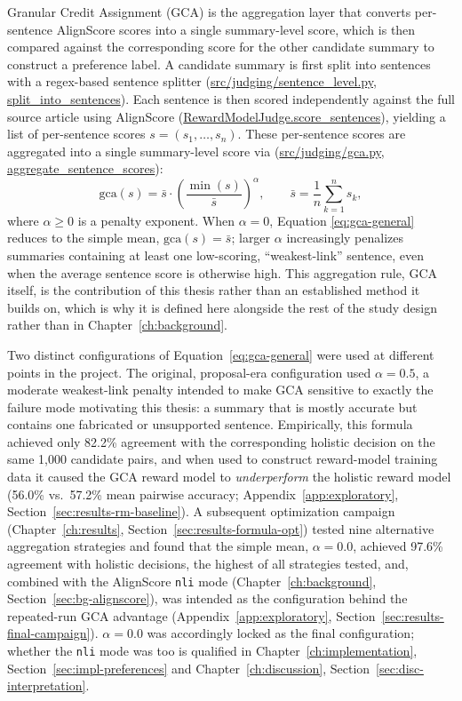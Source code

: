 Granular Credit Assignment (GCA) is the aggregation layer that converts
per-sentence AlignScore scores into a single summary-level score, which is then
compared against the corresponding score for the other candidate summary to
construct a preference label. A candidate summary is first split into sentences
with a regex-based sentence splitter (\url{src/judging/sentence_level.py},
\url{split_into_sentences}). Each sentence is then scored independently
against the full source article using AlignScore
(\url{RewardModelJudge.score_sentences}), yielding a list of per-sentence
scores $s = (s_1, \ldots, s_n)$. These per-sentence scores are aggregated into a
single summary-level score via (\url{src/judging/gca.py},
\url{aggregate_sentence_scores}):
\begin{equation}
  \mathrm{gca}(s) = \bar{s} \cdot \left( \frac{\min(s)}{\bar{s}} \right)^{\alpha},
  \qquad \bar{s} = \frac{1}{n}\sum_{k=1}^{n} s_k,
  \label{eq:gca-general}
\end{equation}
where $\alpha \geq 0$ is a penalty exponent. When $\alpha = 0$, Equation
\ref{eq:gca-general} reduces to the simple mean, $\mathrm{gca}(s) = \bar{s}$;
larger $\alpha$ increasingly penalizes summaries containing at least one
low-scoring, ``weakest-link'' sentence, even when the average sentence score is
otherwise high. This aggregation rule, GCA itself, is the contribution of this
thesis rather than an established method it builds on, which is why it is
defined here alongside the rest of the study design rather than in
Chapter~\ref{ch:background}.

Two distinct configurations of Equation~\ref{eq:gca-general} were used at
different points in the project. The original, proposal-era configuration used
$\alpha = 0.5$, a moderate weakest-link penalty intended to make GCA sensitive to
exactly the failure mode motivating this thesis: a summary that is mostly accurate
but contains one fabricated or unsupported sentence. Empirically, this formula
achieved only 82.2\% agreement with the corresponding holistic decision on the
same 1{,}000 candidate pairs, and when used to construct reward-model training
data it caused the GCA reward model to \emph{underperform} the holistic reward
model (56.0\% vs.\ 57.2\% mean pairwise accuracy;
Appendix~\ref{app:exploratory}, Section~\ref{sec:results-rm-baseline}). A subsequent optimization campaign
(Chapter~\ref{ch:results}, Section~\ref{sec:results-formula-opt}) tested nine alternative aggregation
strategies and found that the simple mean, $\alpha = 0.0$, achieved 97.6\%
agreement with holistic decisions, the highest of all strategies tested, and,
combined with the AlignScore \texttt{nli} mode (Chapter~\ref{ch:background}, Section~\ref{sec:bg-alignscore}),
was intended as the configuration behind the repeated-run GCA advantage
(Appendix~\ref{app:exploratory}, Section~\ref{sec:results-final-campaign}). $\alpha = 0.0$ was accordingly locked
as the final configuration; whether the \texttt{nli} mode was too is
qualified in Chapter~\ref{ch:implementation},
Section~\ref{sec:impl-preferences} and Chapter~\ref{ch:discussion},
Section~\ref{sec:disc-interpretation}.


